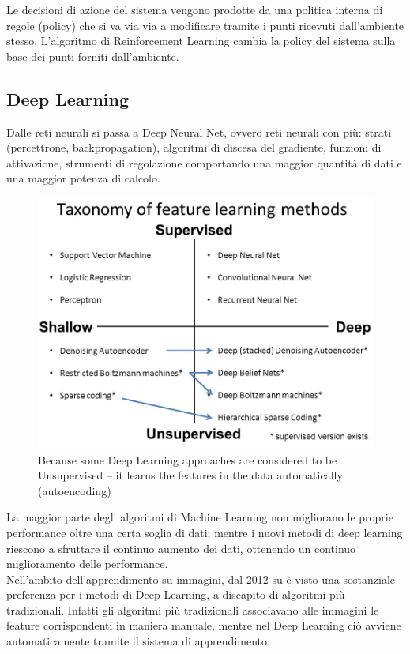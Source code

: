 Le decisioni di azione del sistema vengono prodotte da una politica interna di regole (policy) che si va via via a modificare tramite i punti ricevuti dall’ambiente stesso. L’algoritmo di Reinforcement Learning cambia la policy del sistema sulla base dei punti forniti dall’ambiente.

\subsection{Deep Learning}

Dalle reti neurali si passa a Deep Neural Net, ovvero reti neurali con più: strati (percettrone, backpropagation), algoritmi di discesa del gradiente, funzioni di attivazione, strumenti di regolazione comportando una maggior quantità di dati e una maggior potenza di calcolo.

\begin{figure}[H]
    \centering
    \includegraphics[scale=.4]{imm/deep-learn.jpg}
    \caption{Because some Deep Learning approaches are  considered to be Unsupervised -- it learns the features in the data  automatically (autoencoding)}
\end{figure}

La maggior parte degli algoritmi di Machine Learning non migliorano le proprie performance oltre una certa soglia di dati; mentre i nuovi metodi di deep learning riescono a sfruttare il continuo aumento dei dati, ottenendo un continuo miglioramento delle performance.\\

Nell’ambito dell’apprendimento su immagini, dal 2012 su è visto una sostanziale preferenza per i metodi di Deep Learning, a discapito di algoritmi più tradizionali.
Infatti gli algoritmi più tradizionali associavano alle immagini le feature corrispondenti in maniera manuale, mentre nel Deep Learning ciò avviene automaticamente tramite il sistema di apprendimento.\\

